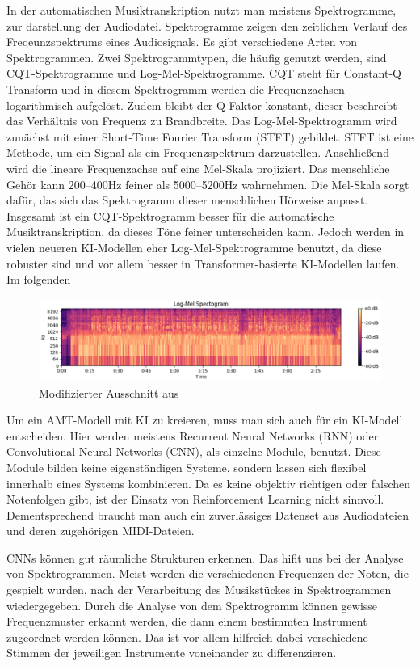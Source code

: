 In der automatischen Musiktranskription nutzt man meistens Spektrogramme, zur darstellung der Audiodatei.
Spektrogramme zeigen den zeitlichen Verlauf des Freqeunzspektrums eines Audiosignals.
Es gibt verschiedene Arten von Spektrogrammen.
Zwei Spektrogrammtypen, die häufig genutzt werden, sind CQT-Spektrogramme und Log-Mel-Spektrogramme.
CQT steht für Constant-Q Transform und in diesem Spektrogramm werden die Frequenzachsen logarithmisch aufgelöst.
Zudem bleibt der Q-Faktor konstant, dieser beschreibt das Verhältnis von Frequenz zu Brandbreite.
Das Log-Mel-Spektrogramm wird zunächst mit einer Short-Time Fourier Transform (STFT) gebildet.
STFT ist eine Methode, um ein Signal als ein Frequenzspektrum darzustellen.
Anschließend wird die lineare Frequenzachse auf eine Mel-Skala projiziert.
Das menschliche Gehör kann 200--400Hz feiner als 5000--5200Hz wahrnehmen.
Die Mel-Skala sorgt dafür, das sich das Spektrogramm dieser menschlichen Hörweise anpasst.
Insgesamt ist ein CQT-Spektrogramm besser für die automatische Musiktranskription,
da dieses Töne feiner unterscheiden kann.
Jedoch werden in vielen neueren KI-Modellen eher Log-Mel-Spektrogramme benutzt,
da diese robuster sind und vor allem besser in Transformer-basierte KI-Modellen laufen.
Im folgenden
\begin{figure}[H]
    \centering
    \includegraphics[width=1\textwidth]{Graphics/logMelSpek}
    \caption{Modifizierter Ausschnitt aus \cite{pyrovolakis2022multimodal}}
    \label{fig:mel-vs-logmel-mfcc}
\end{figure}

Um ein AMT-Modell mit KI zu kreieren, muss man sich auch für ein KI-Modell entscheiden.
Hier werden meistens Recurrent Neural Networks (RNN) oder Convolutional Neural Networks (CNN),
als einzelne Module, benutzt.
\cite{Boeck2012}
Diese Module bilden keine eigenständigen Systeme, sondern lassen sich flexibel innerhalb eines Systems kombinieren.
Da es keine objektiv richtigen oder falschen Notenfolgen gibt, ist der Einsatz von Reinforcement Learning nicht sinnvoll.
Dementsprechend braucht man auch ein zuverlässiges Datenset aus Audiodateien und deren zugehörigen MIDI-Dateien.

CNNs können gut räumliche Strukturen erkennen.
Das hiflt uns bei der Analyse von Spektrogrammen.
Meist werden die verschiedenen Frequenzen der Noten, die gespielt wurden,
nach der Verarbeitung des Musikstückes in Spektrogrammen wiedergegeben.
Durch die Analyse von dem Spektrogramm können gewisse Frequenzmuster erkannt werden,
die dann einem bestimmten Instrument zugeordnet werden können.
Das ist vor allem hilfreich dabei verschiedene Stimmen der jeweiligen Instrumente voneinander zu differenzieren.
\cite{han2016deep}

